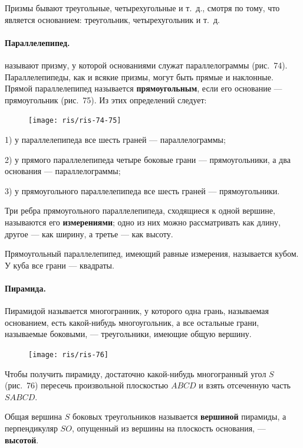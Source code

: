 \documentclass[twoside]{book}
\begin{document}
Призмы бывают треугольные, четырехугольные и т.~д., смотря по тому, что является основанием: треугольник, четырехугольник и т.~д.

\paragraph{Параллелепипед.}\label{1938/s69}
 называют призму, у которой основаниями служат параллелограммы (рис.~74).
Параллелепипеды, как и всякие призмы, могут быть прямые и наклонные.
Прямой параллелепипед называется \textbf{прямоугольным}, если его основание --- прямоугольник (рис.~75).
Из этих определений следует:

\begin{figure}[h!]
\centering
\texttt{[image: ris/ris-74-75]}
\caption{}
\end{figure}

1) у параллелепипеда все шесть граней --- параллелограммы;

2) у прямого параллелепипеда четыре боковые грани --- прямоугольники, а два основания --- параллелограммы;

3) у прямоугольного параллелепипеда все шесть граней --- прямоугольники.

Три ребра прямоугольного параллелепипеда, сходящиеся к одной вершине, называются его \textbf{измерениями};
одно из них можно рассматривать как длину, другое --- как ширину, а третье --- как высоту.

Прямоугольный параллелепипед, имеющий равные измерения, называется кубом.
У куба все грани --- квадраты.

\paragraph{Пирамида.}\label{1938/s70}
Пирамидой называется многогранник, у которого одна грань, называемая основанием, есть какой-нибудь многоугольник, а все остальные грани, называемые боковыми, --- треугольники, имеющие общую вершину.

\begin{figure}[h!]
\centering
\texttt{[image: ris/ris-76]}
\caption{}
\end{figure}

Чтобы получить пирамиду, достаточно какой-нибудь многогранный угол $S$ (рис.~76) пересечь произвольной плоскостью $ABCD$ и взять отсеченную часть $SABCD$.

Общая вершина $S$ боковых треугольников называется \textbf{вершиной} пирамиды, а перпендикуляр $SO$, опущенный из вершины на плоскость основания, --- \textbf{высотой}.
\end{document}
